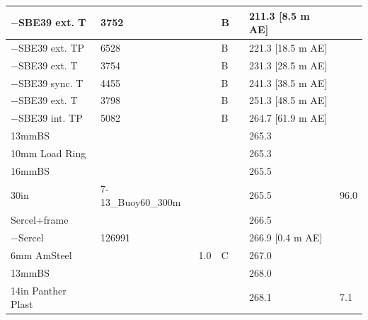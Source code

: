 \documentclass{article}
\begin{document}
\begin{tabularx}{\linewidth}{|X|X|l|l|l|X|l|}
$-$SBE39 ext. T & 3752 &  & B &  & 211.3 [8.5 m AE] &  \\ \hline
$-$SBE39 ext. TP & 6528 &  & B &  & 221.3 [18.5 m AE] &  \\ \hline
$-$SBE39 ext. T & 3754 &  & B &  & 231.3 [28.5 m AE] &  \\ \hline
$-$SBE39 sync. T & 4455 &  & B &  & 241.3 [38.5 m AE] &  \\ \hline
$-$SBE39 ext. T & 3798 &  & B &  & 251.3 [48.5 m AE] &  \\ \hline
$-$SBE39 int. TP & 5082 &  & B &  & 264.7 [61.9 m AE] &  \\ \hline
13mmBS &  &  &  &  & 265.3 &  \\ \hline
10mm Load Ring &  &  &  &  & 265.3 &  \\ \hline
16mmBS &  &  &  &  & 265.5 &  \\ \hline
30in & 7-13\_Buoy60\_300m &  &  &  & 265.5 & 96.0 \\ \hline
Sercel+frame &  &  &  &  & 266.5 &  \\ \hline
$-$Sercel & 126991 &  &  &  & 266.9 [0.4 m AE] &  \\ \hline
6mm AmSteel &  & 1.0 & C &  & 267.0 &  \\ \hline
13mmBS &  &  &  &  & 268.0 &  \\ \hline
14in Panther Plast &  &  &  &  & 268.1 & 7.1 \\ \hline
\end{tabularx}
\end{document}
